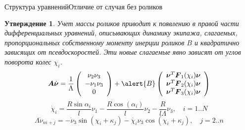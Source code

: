 \documentclass{beamer}
\newtheorem{stmt}{Утверждение}
\begin{document}
\begin{frame}{Структура уравнений}{Отличие от случая без роликов}
     \begin{stmt}
    Учет массы роликов приводит к появлению в правой части дифференциальных уравнений, описывающих динамику экипажа, слагаемых, пропорциональных собственному моменту инерции роликов $B$ и квадратично зависящих от псевдоскоростей. Эти новые слагаемые явно зависят от углов поворота колес $\chi_i$.
    $$\boldsymbol{A}\dot{\boldsymbol{\nu}} = \frac1\Lambda
    \left(
    \begin{array}{c}
         \nu_2\nu_3  \\
         -\nu_1\nu_3 \\
         0
    \end{array}
    \right) + \alert{B}
     \left(
    \begin{array}{c}
         \boldsymbol{\nu}^T\boldsymbol{F}_1(\chi_i)\boldsymbol{\nu}  \\
         \boldsymbol{\nu}^T\boldsymbol{F}_2(\chi_i)\boldsymbol{\nu} \\
         \boldsymbol{\nu}^T\boldsymbol{F}_3(\chi_i)\boldsymbol{\nu}
    \end{array}
    \right)
    $$
    $$
    \dot{\chi}_i = \frac{R\sin\alpha_i}{l}\nu_1 - \frac{R\cos(\alpha_i)}{l}\nu_2 - \frac{R}{l\Lambda}\nu_3, \quad i = 1..N
    $$
    $$
    \Lambda\dot{\nu}_{ni+j} = -\dot{\nu}_3\sin(\chi_i+\kappa_j) - \dot{\chi_i}\nu_3\cos(\chi_i+\kappa_j), \quad j = 2..n
    $$
    \end{stmt}
\end{frame}
\end{document}
